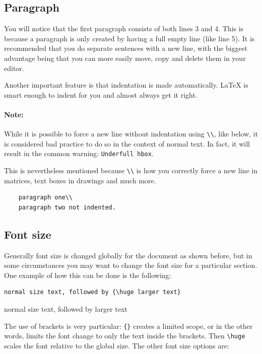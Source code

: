 \subsection{Paragraph}
You will notice that the first paragraph consists of both lines 3 and 4.
This is because a paragraph is only created by having a full empty line (like line 5).
It is recommended that you do separate sentences with a new line, with the biggest advantage being that you can more easily move, copy and delete them in your editor.

Another important feature is that indentation is made automatically.
\LaTeX{} is smart enough to indent for you and almost always get it right.


\paragraph{Note:}
While it is possible to force a new line without indentation using \verb|\\|, like below, it is considered bad practice to do so in the context of normal text.
In fact, it will result in the common warning: \verb|Underfull hbox|.

This is nevertheless mentioned because \verb|\\| is how you correctly force a new line in matrices, text boxes in drawings and much more.
\begin{lstlisting}
    paragraph one\\
    paragraph two not indented.
\end{lstlisting}

\subsection{Font size}
Generally font size is changed globally for the document as shown before, but in some circumstances you may want to change the font size for a particular section. 
One example of how this can be done is the following:

\begin{lstlisting}
normal size text, followed by {\huge larger text}
\end{lstlisting}
normal size text, followed by {\huge larger text}

The use of brackets is very particular: \verb|{}| creates a limited scope, or in the other words, limits the font change to only the text inside the brackets.
Then \verb|\huge| scales the font relative to the global size.
The other font size options are:

